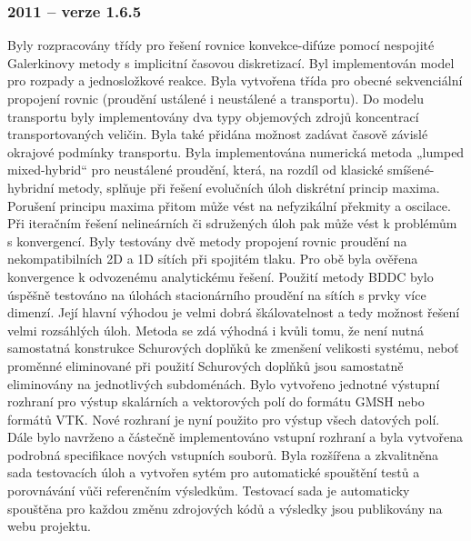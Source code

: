\documentclass[11pt]{report}
\begin{document}
\subsubsection{2011 -- verze 1.6.5}
Byly rozpracovány třídy pro řešení rovnice konvekce-difúze pomocí nespojité 
Galerkinovy metody s implicitní časovou diskretizací. Byl implementován model 
pro rozpady a jednosložkové reakce. Byla vytvořena třída pro obecné sekvenciální 
propojení rovnic (proudění ustálené i neustálené a transportu). Do modelu 
transportu byly implementovány dva typy objemových zdrojů koncentrací 
transportovaných veličin. Byla také přidána možnost zadávat časově závislé 
okrajové podmínky transportu.
Byla implementována numerická metoda „lumped mixed-hybrid“ pro neustálené 
proudění, která, na rozdíl od klasické smíšené-hybridní metody, splňuje při 
řešení evolučních úloh diskrétní princip maxima. Porušení principu maxima přitom 
může vést na nefyzikální překmity a oscilace. Při iteračním řešení nelineárních 
či sdružených úloh pak může vést k problémům s konvergencí.
Byly testovány dvě metody propojení rovnic proudění na nekompatibilních 2D a 1D 
sítích při spojitém tlaku. Pro obě byla ověřena konvergence k odvozenému 
analytickému řešení.
Použití metody BDDC bylo úspěšně testováno na úlohách stacionárního proudění na 
sítích s prvky více dimenzí. Její hlavní výhodou je velmi dobrá škálovatelnost a 
tedy možnost řešení velmi rozsáhlých úloh. Metoda se zdá výhodná i kvůli tomu, 
že není nutná samostatná konstrukce Schurových doplňků ke zmenšení velikosti 
systému, neboť proměnné eliminované při použití Schurových doplňků jsou 
samostatně eliminovány na jednotlivých subdoménách.
Bylo vytvořeno jednotné výstupní rozhraní pro výstup skalárních a vektorových 
polí do formátu GMSH nebo formátů VTK. Nové rozhraní je nyní použito pro výstup 
všech datových polí. Dále bylo navrženo a částečně implementováno vstupní 
rozhraní a byla vytvořena podrobná specifikace nových vstupních souborů. 
Byla rozšířena a zkvalitněna sada testovacích úloh a vytvořen sytém pro 
automatické spouštění testů a porovnávání vůči referenčním výsledkům. Testovací 
sada je automaticky spouštěna pro každou změnu zdrojových kódů a výsledky jsou 
publikovány na webu projektu. 
\end{document}
